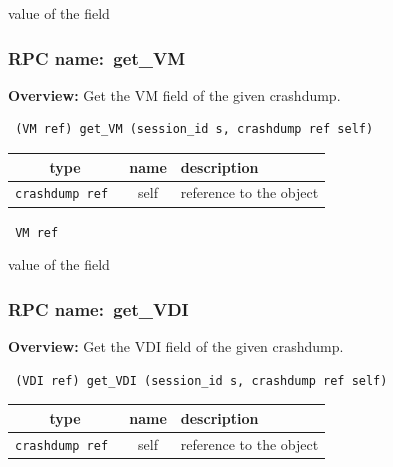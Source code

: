 value of the field
\vspace{0.3cm}
\vspace{0.3cm}
\vspace{0.3cm}
\subsubsection{RPC name:~get\_VM}

{\bf Overview:} 
Get the VM field of the given crashdump.

\begin{verbatim} (VM ref) get_VM (session_id s, crashdump ref self)\end{verbatim}



 
\vspace{0.3cm}
\begin{tabular}{|c|c|p{7cm}|}
 \hline
{\bf type} & {\bf name} & {\bf description} \\ \hline
{\tt crashdump ref } & self & reference to the object \\ \hline 

\end{tabular}

\vspace{0.3cm}

{\tt 
VM ref
}


value of the field
\vspace{0.3cm}
\vspace{0.3cm}
\vspace{0.3cm}
\subsubsection{RPC name:~get\_VDI}

{\bf Overview:} 
Get the VDI field of the given crashdump.

\begin{verbatim} (VDI ref) get_VDI (session_id s, crashdump ref self)\end{verbatim}



 
\vspace{0.3cm}
\begin{tabular}{|c|c|p{7cm}|}
 \hline
{\bf type} & {\bf name} & {\bf description} \\ \hline
{\tt crashdump ref } & self & reference to the object \\ \hline 

\end{tabular}

